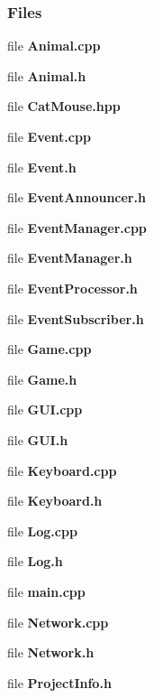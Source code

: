 \subsubsection*{Files}
\begin{DoxyCompactItemize}
\item 
file {\bf Animal.\-cpp}
\item 
file {\bf Animal.\-h}
\item 
file {\bf Cat\-Mouse.\-hpp}
\item 
file {\bf Event.\-cpp}
\item 
file {\bf Event.\-h}
\item 
file {\bf Event\-Announcer.\-h}
\item 
file {\bf Event\-Manager.\-cpp}
\item 
file {\bf Event\-Manager.\-h}
\item 
file {\bf Event\-Processor.\-h}
\item 
file {\bf Event\-Subscriber.\-h}
\item 
file {\bf Game.\-cpp}
\item 
file {\bf Game.\-h}
\item 
file {\bf G\-U\-I.\-cpp}
\item 
file {\bf G\-U\-I.\-h}
\item 
file {\bf Keyboard.\-cpp}
\item 
file {\bf Keyboard.\-h}
\item 
file {\bf Log.\-cpp}
\item 
file {\bf Log.\-h}
\item 
file {\bf main.\-cpp}
\item 
file {\bf Network.\-cpp}
\item 
file {\bf Network.\-h}
\item 
file {\bf Project\-Info.\-h}
\end{DoxyCompactItemize}

